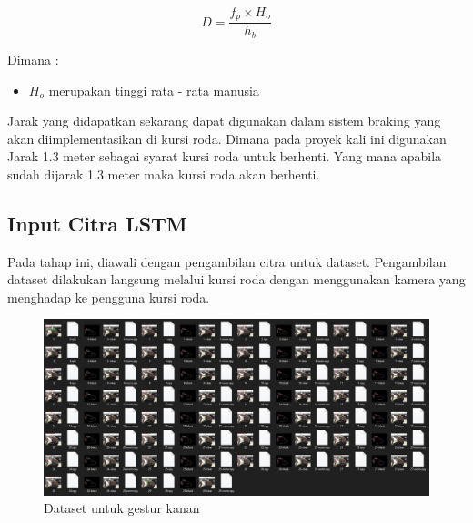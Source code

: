 \begin{equation}
    D = \frac{f_p \times H_o}{h_b}
\end{equation}

Dimana :
\begin{itemize}
    \item $H_o$ merupakan tinggi rata - rata manusia
\end{itemize}

Jarak yang didapatkan sekarang dapat digunakan dalam sistem braking yang akan diimplementasikan di kursi roda. Dimana pada proyek kali ini digunakan Jarak 1.3 meter sebagai syarat kursi roda untuk berhenti. Yang mana apabila sudah dijarak 1.3 meter maka kursi roda akan berhenti.

\subsection{Input Citra LSTM}
Pada tahap ini, diawali dengan pengambilan citra untuk dataset. Pengambilan dataset dilakukan langsung melalui kursi roda dengan menggunakan kamera yang menghadap ke pengguna kursi roda. 
\begin{figure} [H] \centering
  \includegraphics[scale=0.28]{gambar/dataset.jpg}
  \caption{Dataset untuk gestur kanan}
  \label{fig:gestur dataset}
\end{figure}

